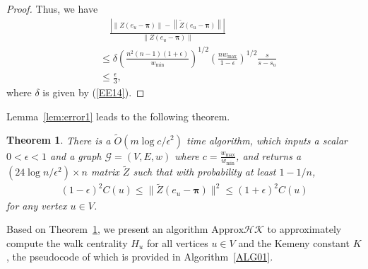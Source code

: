 \documentclass[sigconf]{acmart}
\newtheorem{theorem}{Theorem}[section]
\def\abs#1{\left|#1  \right|}
\def\norm#1{\left\| #1 \right\|}
\def\calG{\mathcal{G}}
\newcommand\ppi{\boldsymbol{\pi}}
\newcommand\ee{\boldsymbol{\mathit{e}}}
\newcommand\LL{\boldsymbol{\mathit{L}}}
\newcommand\ZZtil{\boldsymbol{\mathit{\tilde{Z}}}}
\newcommand\ZZ{\boldsymbol{\mathit{Z}}}
\newcommand\Otil{\widetilde{O}}
\begin{document}
\begin{proof}
	Thus, we have
	\begin{align*}
		 & \quad \frac{
			\abs{ \norm{\ZZ (\ee_{u} - \ppi)} -  \norm{\ZZtil  (\ee_{u} - \ppi)}}
		}{
			\norm{\ZZ (\ee_{u} - \ppi)}
		}                                                 \\
		 & \le
		\delta \left(\frac{n^2(n-1) (1+\epsilon)}{w_{\min}}\right)^{1/2}\left(\frac{n
		w_{\max}}{1-\epsilon}\right)^{1/2}\frac{s}{s-s_u} \\
		 & \le \frac{\epsilon}{3},
	\end{align*}
	where $\delta$ is given by (\ref{EE14}).
\end{proof}

Lemma~\ref{lem:error1} leads to the following theorem.
\begin{theorem}
	\label{TheoAlg1}
	There is a $\Otil(m\log{c}/\epsilon^2)$ time algorithm, which  inputs  a scalar $0<\epsilon<1$ and a graph $\calG=(V,E,w)$ where $c=\frac{w_{\max}}{w_{\min}}$, and returns a $(24\log n/\epsilon^2)\times n$ matrix $\ZZtil$ such that with probability at least $1-1/n$,
	\begin{align}
		(1-\epsilon)^2  C(u) \leq \|\ZZtil(\ee_u-\ppi)\|^2 \leq (1+\epsilon)^2  C(u)\nonumber
	\end{align}
	for any vertex $u \in V$.
\end{theorem}

Based on Theorem~\ref{TheoAlg1}, we  present an algorithm $\text{Approx}\mathcal{HK}$ to approximately compute the walk centrality $H_u$ for all  vertices  $u \in V$ and the Kemeny constant $K$, the pseudocode of which is provided in Algorithm~\ref{ALG01}.
\end{document}
